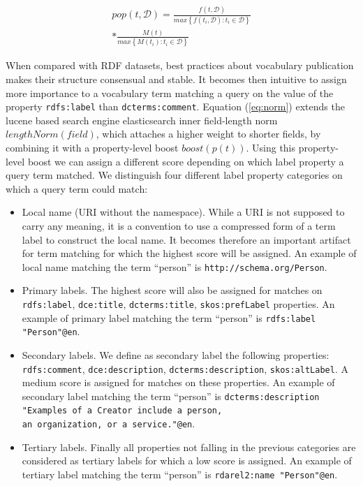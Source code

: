 \documentclass{iosart2c}
\begin{document}
\begin{equation}\label{eq:pop}
\begin{split}
pop(t,\mathcal{D}) = \frac{f(t,\mathcal{D})}{max\left\{f(t_i,\mathcal{D}): t_i \in \mathcal{D}\right\}} \\
* \frac{M(t)}{max\left\{M(t_i): t_i \in \mathcal{D}\right\}}
\end{split}
\end{equation}

When compared with RDF datasets, best practices about vocabulary publication makes their structure consensual and stable. It becomes then intuitive to assign more importance to a vocabulary term matching a query on the value of the property {\small\texttt{rdfs:label}} than {\small\texttt{dcterms:comment}}. Equation (\ref{eq:norm}) extends the lucene based search engine elasticsearch inner field-length norm $lengthNorm(field)$, which attaches a higher weight to shorter fields, by combining it with a property-level boost $boost(p(t))$. Using this property-level boost we can assign a different score depending on which label property a query term matched. We distinguish four different label property categories on which a query term could match: 
		\begin{itemize}
 			\item Local name (URI without the namespace). While a URI is not supposed to carry any meaning, it is a convention to use a compressed form of a term label to construct the local name. It becomes therefore an important artifact for term matching for which the highest score will be assigned. An example of local name matching the term ``person'' is {\small\texttt{http://schema.org/Person}}.
			\item Primary labels. The highest score will also be assigned for matches on {\small\texttt{rdfs:label}}, {\small\texttt{dce:title}}, {\small\texttt{dcterms:title}}, {\small\texttt{skos:prefLabel}} properties. An example of primary label matching the term ``person'' is {\small\texttt{rdfs:label "Person"@en}}.
			\item Secondary labels. We define as secondary label the following properties: {\small\texttt{rdfs:comment}}, {\small\texttt{dce:description}}, {\small\texttt{dcterms:description}}, {\small\texttt{skos:altLabel}}. A medium score is assigned for matches on these properties. An example of secondary label matching the term ``person'' is {\small\texttt{dcterms:description}} {\small\texttt{"Examples of a Creator include a person,\\ an organization, or a service."@en}}.
			\item Tertiary labels. Finally all properties not falling in the previous categories are considered as tertiary labels for which a low score is assigned. An example of tertiary label matching the term ``person'' is {\small\texttt{rdarel2:name "Person"@en}}. 
		\end{itemize}
\end{document}
